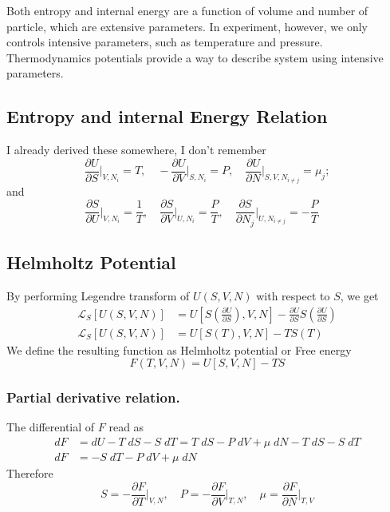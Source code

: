 \documentclass[../../../Main.tex]{subfiles}
\begin{document}
Both entropy and internal energy are a function of volume and number of particle, which are extensive parameters. In experiment, however, we only controls intensive parameters, such as temperature and pressure. Thermodynamics potentials provide a way to describe system using intensive parameters.

\subsection{Entropy and internal Energy Relation}
I already derived these somewhere, I don't remember
\begin{equation*}
    \frac{\partial U}{\partial S}\bigg|_{V, N_{i} }=T,\quad
    -\frac{\partial U}{\partial V}\bigg|_{S, N_{i} }=P,\quad
    \frac{\partial U}{\partial N}\bigg|_{S, V, N_{i\neq j} }=\mu_j;
\end{equation*}
and 
\begin{equation*}
    \frac{\partial S}{\partial U}\bigg|_{V, N_i}=\frac{1}{T},\quad
    \frac{\partial S}{\partial V}\bigg|_{U, N_i}=\frac{P}{T},\quad
    \frac{\partial S}{\partial N_j}\bigg|_{U, N_{i\neq j}}=-\frac{P}{T}\quad
\end{equation*}

\subsection{Helmholtz Potential}
By performing Legendre transform of $U(S,V,N)$ with respect to $S$, we get
\begin{align*}
    \mathcal{L}_S[U(S,V,N)]&=U\left[S\left(\frac{\partial U}{\partial S}\right), V,N\right]-\frac{\partial U}{\partial S}S\left(\frac{\partial U}{\partial S}\right)\\
    \mathcal{L}_S[U(S,V,N)]&=U[S(T),V,N]-TS(T)
\end{align*}
We define the resulting function as Helmholtz potential or Free energy
\begin{equation*}
    F(T,V,N)=U[S,V,N]-TS
\end{equation*}

\subsubsection{Partial derivative relation.} The differential of $F$ read as
\begin{align*}
    dF&=dU-T\;dS-S\;dT=T\;dS-P\;dV+\mu \;dN-T\;dS-S\;dT\\
    dF&=-S\;dT - P\; dV + \mu \;dN
\end{align*}
Therefore
\begin{equation*}
    S=-\frac{\partial F}{\partial T}\bigg|_{V,N},\quad P=-\frac{\partial F}{\partial V}\bigg|_{T,N},\quad \mu=\frac{\partial F}{\partial N}\bigg|_{T,V}
\end{equation*}
\end{document}
